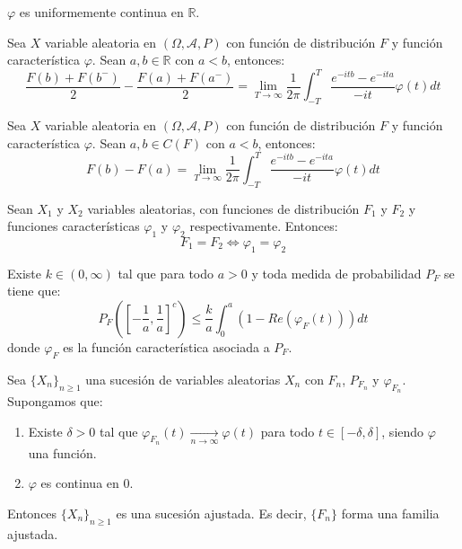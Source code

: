 \begin{theorem}
    $\varphi$ es uniformemente continua en $\mathbb{R}$.
\end{theorem}

\begin{theorem}
    Sea $X$ variable aleatoria en $(\Omega, \mathcal{A}, P)$ con función de distribución $F$ y función característica $\varphi$.
    Sean $a, b \in \mathbb{R}$ con $a < b$, entonces:
    $$\frac{F(b)+F(b^-)}{2} - \frac{F(a)+F(a^-)}{2} = \lim\limits_{T \to \infty} \frac{1}{2\pi} \int_{-T}^T \frac{e^{-itb}-e^{-ita}}{-it} \varphi(t)dt$$
\end{theorem}

\begin{corollary}
    Sea $X$ variable aleatoria en $(\Omega, \mathcal{A}, P)$ con función de distribución $F$ y función característica $\varphi$.
    Sean $a, b \in C(F)$ con $a < b$, entonces:
    $$F(b) - F(a) = \lim\limits_{T \to \infty} \frac{1}{2\pi} \int_{-T}^T \frac{e^{-itb}-e^{-ita}}{-it} \varphi(t)dt$$
\end{corollary}

\begin{theorem}[Unicidad]
    Sean $X_1$ y $X_2$ variables aleatorias, con funciones de distribución $F_1$ y $F_2$ y funciones características $\varphi_1$ y $\varphi_2$ respectivamente.
    Entonces:
    $$F_1 = F_2 \Leftrightarrow \varphi_1 = \varphi_2$$
\end{theorem}

\begin{theorem}
    Existe $k \in (0, \infty)$ tal que para todo $a > 0$ y toda medida de probabilidad $P_F$ se tiene que:
    $$P_F \left(\left[-\frac{1}{a}, \frac{1}{a}\right]^c\right) \leq \frac{k}{a} \int_0^a (1 - Re(\varphi_F(t)))dt$$
    donde $\varphi_F$ es la función característica asociada a $P_F$.
\end{theorem}

\begin{corollary}
    Sea $\{X_n\}_{n \geq 1}$ una sucesión de variables aleatorias $X_n$ con $F_n$, $P_{F_n}$ y $\varphi_{F_n}$.
    Supongamos que:
    \begin{enumerate}
        \item Existe $\delta > 0$ tal que $\varphi_{F_n}(t) \xrightarrow[n \to \infty]{} \varphi(t)$ para todo $t \in [-\delta, \delta]$, siendo $\varphi$ una función.
        \item $\varphi$ es continua en 0.
    \end{enumerate}
    Entonces $\{X_n\}_{n \geq 1}$ es una sucesión ajustada.
    Es decir, $\{F_n\}$ forma una familia ajustada.
\end{corollary}

